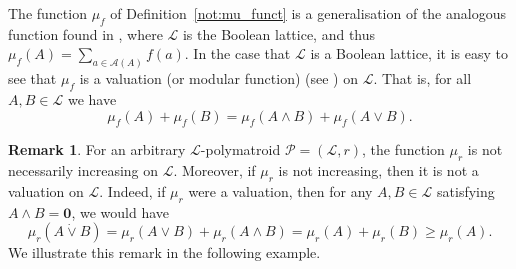 \documentclass[a4paper,11pt,reqno]{article}
\theoremstyle{definition}
\newtheorem{remark}[theorem]{{{Remark}}}
\newcommand{\mL}{\mathcal{L}}
\newcommand{\mP}{\mathcal{P}}
\newcommand{\mA}{\mathcal{A}}
\newcommand{\zero}{{\mathbf{0}}}
\begin{document}
The function $\mu_f$ of Definition~\ref{not:mu_funct} is a generalisation of the analogous function found in \cite{Csirm20}, where $\mL$ is the Boolean lattice, and thus $\mu_f(A)=\sum_{a\in\mA(A)}f(a)$. In the case that $\mathcal{L}$ is a Boolean lattice, it is easy to see that $\mu_f$ is a valuation (or modular function) (see \cite[Chapter X]{birkhoff_lattice}) on $\mL$. That is, for all $A,B\in\mathcal{L}$ we have 
$$\mu_f(A)+\mu_f(B)=\mu_f(A\wedge B)+\mu_f(A\vee B).$$


\begin{remark}
    For an arbitrary $\mL$-polymatroid $\mP=(\mL,r)$, the function $\mu_r$ is not necessarily increasing on $\mathcal{L}$. Moreover, if $\mu_r$ is not increasing, then it is not a valuation on $\mL$. Indeed, if $\mu_r$ were a valuation, then for any $A,B \in \mL$ satisfying $A \wedge B = \zero$, we would have  
    \[
    \mu_r(A\dot \vee B) = \mu_r(A\vee B) + \mu_r(A \wedge B) = \mu_r(A) + \mu_r(B) \geq \mu_r(A).
    \]  
    We illustrate this remark in the following example.
\end{remark}
\end{document}
